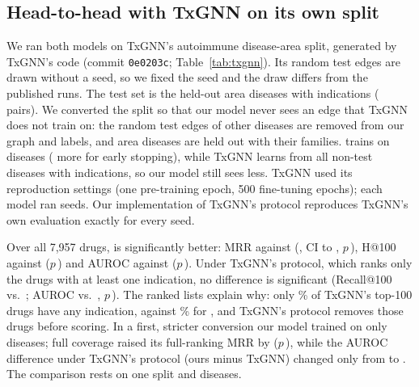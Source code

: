 \documentclass[journal]{IEEEtran}
\begin{document}
\subsection{Head-to-head with TxGNN on its own split}
\label{sec:txgnn}
We ran both models on TxGNN's autoimmune disease-area split, generated by TxGNN's code (commit \texttt{0e0203c}; Table~\ref{tab:txgnn}). Its random test edges are drawn without a seed, so we fixed the seed and the draw differs from the published runs. The test set is the \TxhN{} held-out area diseases with indications (\TxhPairs{} pairs). We converted the split so that our model never sees an edge that TxGNN does not train on: the \TxhDroppedEdges{} random test edges of \TxhDroppedDis{} other diseases are removed from our graph and labels, and area diseases are held out with their families. \sysname trains on \TxhTrainDis{} diseases (\TxhValidDis{} more for early stopping), while TxGNN learns from all \TxhNonTestDis{} non-test diseases with indications, so our model still sees less. TxGNN used its reproduction settings (one pre-training epoch, 500 fine-tuning epochs); each model ran \TxhSeedsTx{} seeds. Our implementation of TxGNN's protocol reproduces TxGNN's own evaluation exactly for every seed.

Over all 7,957 drugs, \sysname is significantly better: MRR \TxhOursMrr{} against \TxhTxMrr{} (\TxhDiffFullMrr, CI \TxhDiffLoFullMrr{} to \TxhDiffHiFullMrr, $p$\,\TxhPwilFullMrr), H@100 \TxhOursHitsHund{} against \TxhTxHitsHund{} ($p$\,\TxhPwilFullHitsHund) and AUROC \TxhOursFullAuroc{} against \TxhTxFullAuroc{} ($p$\,\TxhPwilFullAuroc). Under TxGNN's protocol, which ranks only the \TxhCand{} drugs with at least one indication, no difference is significant (Recall@100 \TxhOursRecall{} vs.\ \TxhTxRecall; AUROC \TxhOursAuroc{} vs.\ \TxhTxAuroc, $p$\,\TxhPwilAuroc). The ranked lists explain why: only \TxhTxIndShare\% of TxGNN's top-100 drugs have any indication, against \TxhOursIndShare\% for \sysname, and TxGNN's protocol removes those drugs before scoring. In a first, stricter conversion our model trained on only \TxhStrictTrainDis{} diseases; full coverage raised its full-ranking MRR by \TxhCovDiffFullMrr{} ($p$\,\TxhCovPwilFullMrr), while the AUROC difference under TxGNN's protocol (ours minus TxGNN) changed only from \TxhStrictDiffAuroc{} to \TxhDiffAuroc. The comparison rests on one split and \TxhN{} diseases.

\begin{table}[!t]
\centering
\caption{TxGNN's autoimmune split (\TxhN{} test diseases), means over seeds. TxGNN protocol: only drugs with $\geq$1 indication are ranked; full ranking: all 7,957 drugs. Lower block: first run with stricter coverage. Published row: TxGNN's repository (different draw).}
\label{tab:txgnn}
\footnotesize
\setlength{\tabcolsep}{5pt}

\end{table}
\end{document}
